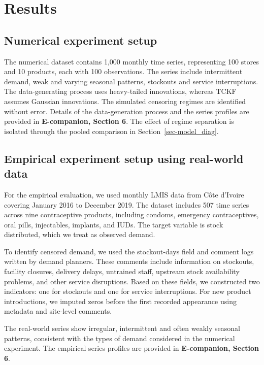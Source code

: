 \documentclass[
  11pt,
  authoryear,
  doubleblind,
  3p]{elsarticle}
\begin{document}
\section{Results}\label{sec-results_wp2}

\subsection{Numerical experiment
setup}\label{numerical-experiment-setup}

The numerical dataset contains 1,000 monthly time series, representing
100 stores and 10 products, each with 100 observations. The series
include intermittent demand, weak and varying seasonal patterns,
stockouts and service interruptions. The data-generating process uses
heavy-tailed innovations, whereas TCKF assumes Gaussian innovations. The
simulated censoring regimes are identified without error. Details of the
data-generation process and the series profiles are provided in
\textbf{E-companion, Section 6}. The effect of regime separation is
isolated through the pooled comparison in Section~\ref{sec-model_diag}.

\subsection{Empirical experiment setup using real-world
data}\label{empirical-experiment-setup-using-real-world-data}

For the empirical evaluation, we used monthly LMIS data from Côte
d'Ivoire covering January 2016 to December 2019. The dataset includes
507 time series across nine contraceptive products, including condoms,
emergency contraceptives, oral pills, injectables, implants, and IUDs.
The target variable is stock distributed, which we treat as observed
demand.

To identify censored demand, we used the stockout-days field and comment
logs written by demand planners. These comments include information on
stockouts, facility closures, delivery delays, untrained staff, upstream
stock availability problems, and other service disruptions. Based on
these fields, we constructed two indicators: one for stockouts and one
for service interruptions. For new product introductions, we imputed
zeros before the first recorded appearance using metadata and site-level
comments.

The real-world series show irregular, intermittent and often weakly
seasonal patterns, consistent with the types of demand considered in the
numerical experiment. The empirical series profiles are provided in
\textbf{E-companion, Section 6}.
\end{document}
